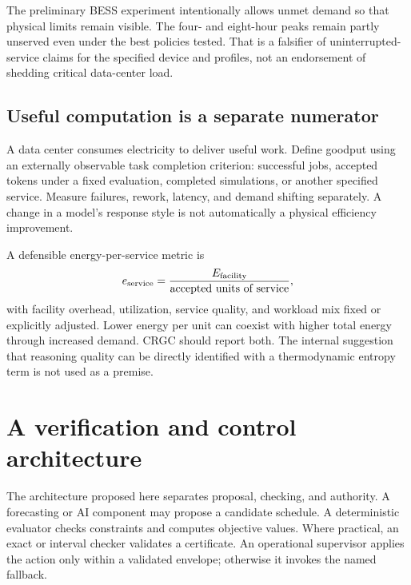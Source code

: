 \documentclass[11pt,letterpaper]{article}
\begin{document}
The preliminary BESS experiment intentionally allows unmet demand so that physical limits remain visible. The four- and eight-hour peaks remain partly unserved even under the best policies tested. That is a falsifier of uninterrupted-service claims for the specified device and profiles, not an endorsement of shedding critical data-center load.

\subsection{Useful computation is a separate numerator}
A data center consumes electricity to deliver useful work. Define goodput using an externally observable task completion criterion: successful jobs, accepted tokens under a fixed evaluation, completed simulations, or another specified service. Measure failures, rework, latency, and demand shifting separately. A change in a model's response style is not automatically a physical efficiency improvement.

A defensible energy-per-service metric is
\[
 e_{\rm service}=\frac{E_{\rm facility}}{\text{accepted units of service}},
\]
with facility overhead, utilization, service quality, and workload mix fixed or explicitly adjusted. Lower energy per unit can coexist with higher total energy through increased demand. CRGC should report both. The internal suggestion that reasoning quality can be directly identified with a thermodynamic entropy term is not used as a premise.

\section{A verification and control architecture}
\label{sec:assurance}
The architecture proposed here separates proposal, checking, and authority. A forecasting or AI component may propose a candidate schedule. A deterministic evaluator checks constraints and computes objective values. Where practical, an exact or interval checker validates a certificate. An operational supervisor applies the action only within a validated envelope; otherwise it invokes the named fallback.

\begin{center}
\end{center}
\end{document}
